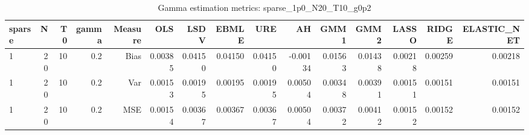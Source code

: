 \begin{table}[!htbp]\centering
\caption{Gamma estimation metrics: sparse_1p0_N20_T10_g0p2}
\label{tab:table1_sparse_1p0_N20_T10_g0p2}
\begin{tabular}{lrrrrrrrrrrrrrr}
\hline
sparse & N & T0 & gamma & Measure & OLS & LSDV & EBMLE & URE & AH & GMM1 & GMM2 & LASSO & RIDGE & ELASTIC_NET \\
\hline
1 & 20 & 10 & 0.2 & Bias & 0.00385 & 0.04150 & 0.04150 & 0.04150 & -0.00134 & 0.01563 & 0.01438 & 0.00218 & 0.00259 & 0.00218 \\
1 & 20 & 10 & 0.2 & Var & 0.00153 & 0.00195 & 0.00195 & 0.00195 & 0.00504 & 0.00348 & 0.00391 & 0.00151 & 0.00151 & 0.00151 \\
1 & 20 & 10 & 0.2 & MSE & 0.00154 & 0.00367 & 0.00367 & 0.00367 & 0.00504 & 0.00372 & 0.00412 & 0.00152 & 0.00152 & 0.00152 \\
\hline
\end{tabular}
\end{table}

